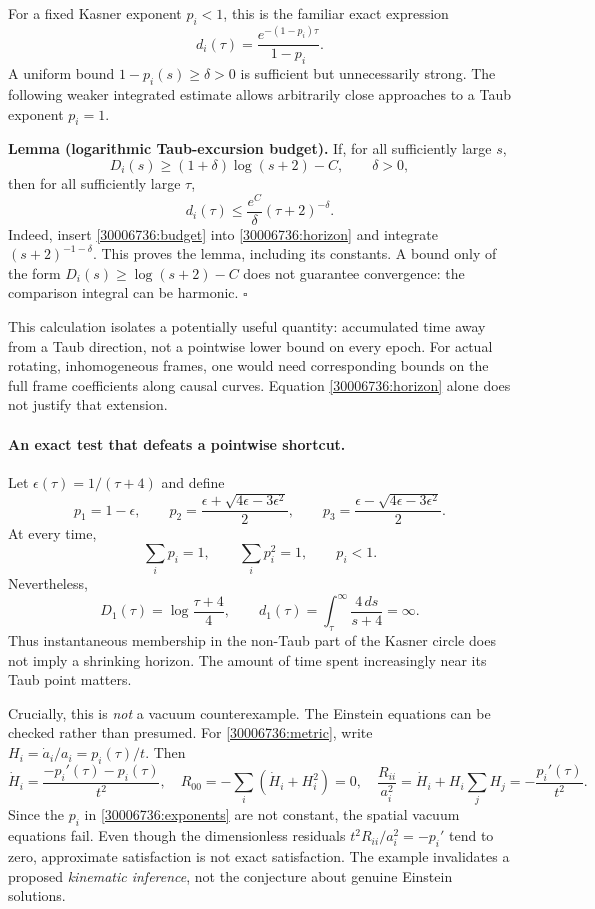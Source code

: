 \documentclass[11pt,a4paper]{article}
\numberwithin{equation}{section}
\begin{document}
For a fixed Kasner exponent $p_i<1$, this is the familiar exact expression
\[
 d_i(\tau)=\frac{e^{-(1-p_i)\tau}}{1-p_i}.
\]
A uniform bound $1-p_i(s)\ge\delta>0$ is sufficient but unnecessarily strong.
The following weaker integrated estimate allows arbitrarily close approaches
to a Taub exponent $p_i=1$.

\textbf{Lemma (logarithmic Taub-excursion budget).}
If, for all sufficiently large $s$,
\begin{equation}\label{30006736:budget}
 D_i(s)\ge (1+\delta)\log(s+2)-C,
 \qquad \delta>0,
\end{equation}
then for all sufficiently large $\tau$,
\begin{equation}\label{30006736:tail}
 d_i(\tau)\le\frac{e^C}{\delta}(\tau+2)^{-\delta}.
\end{equation}
Indeed, insert \eqref{30006736:budget} into \eqref{30006736:horizon} and integrate
$(s+2)^{-1-\delta}$. This proves the lemma, including its constants.
A bound only of the form $D_i(s)\ge\log(s+2)-C$ does not guarantee convergence:
the comparison integral can be harmonic. $\square$

This calculation isolates a potentially useful quantity: accumulated time
away from a Taub direction, not a pointwise lower bound on every epoch.
For actual rotating, inhomogeneous frames, one would need corresponding
bounds on the full frame coefficients along causal curves. Equation
\eqref{30006736:horizon} alone does not justify that extension.

\paragraph{An exact test that defeats a pointwise shortcut.}
Let $\epsilon(\tau)=1/(\tau+4)$ and define
\begin{equation}\label{30006736:exponents}
 p_1=1-\epsilon,\qquad
 p_2=\frac{\epsilon+\sqrt{4\epsilon-3\epsilon^2}}2,\qquad
 p_3=\frac{\epsilon-\sqrt{4\epsilon-3\epsilon^2}}2.
\end{equation}
At every time,
\[
 \sum_i p_i=1,\qquad \sum_i p_i^2=1,\qquad p_i<1.
\]
Nevertheless,
\[
 D_1(\tau)=\log\frac{\tau+4}{4},\qquad
 d_1(\tau)=\int_\tau^\infty\frac{4\,ds}{s+4}=\infty.
\]
Thus instantaneous membership in the non-Taub part of the Kasner circle
does not imply a shrinking horizon. The amount of time spent increasingly
near its Taub point matters.

Crucially, this is \emph{not} a vacuum counterexample. The Einstein equations
can be checked rather than presumed. For \eqref{30006736:metric}, write
$H_i=\dot a_i/a_i=p_i(\tau)/t$. Then
\[
 \dot H_i=\frac{-p_i'(\tau)-p_i(\tau)}{t^2},
 \quad
 R_{00}=-\sum_i(\dot H_i+H_i^2)=0,
 \quad
 \frac{R_{ii}}{a_i^2}=\dot H_i+H_i\sum_jH_j
                  =-\frac{p_i'(\tau)}{t^2}.
\]
Since the $p_i$ in \eqref{30006736:exponents} are not constant, the spatial vacuum
equations fail. Even though the dimensionless residuals
$t^2R_{ii}/a_i^2=-p_i'$ tend to zero, approximate satisfaction is not exact
satisfaction. The example invalidates a proposed \emph{kinematic inference},
not the conjecture about genuine Einstein solutions.
\end{document}
